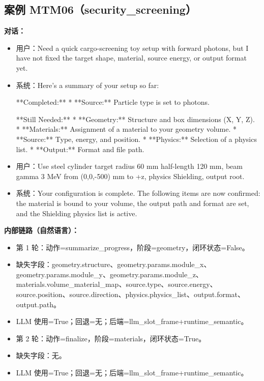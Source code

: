 \documentclass[11pt]{ctexart}
\begin{document}
\subsection{案例 MTM06（security\_screening）}
\textbf{对话：}
\begin{itemize}
\item 用户：Need a quick cargo-screening toy setup with forward photons, but I have not fixed the target shape, material, source energy, or output format yet.
\item 系统：Here's a summary of your setup so far:

**Completed:**
*   **Source:** Particle type is set to photons.

**Still Needed:**
*   **Geometry:** Structure and box dimensions (X, Y, Z).
*   **Materials:** Assignment of a material to your geometry volume.
*   **Source:** Type, energy, and position.
*   **Physics:** Selection of a physics list.
*   **Output:** Format and file path.
\item 用户：Use steel cylinder target radius 60 mm half-length 120 mm, beam gamma 3 MeV from (0,0,-500) mm to +z, physics Shielding, output root.
\item 系统：Your configuration is complete. The following items are now confirmed: the material is bound to your volume, the output path and format are set, and the Shielding physics list is active.
\end{itemize}
\textbf{内部链路（自然语言）：}
\begin{itemize}
\item 第 1 轮：动作=summarize\_progress，阶段=geometry，闭环状态=False。
\item 缺失字段：geometry.structure、geometry.params.module\_x、geometry.params.module\_y、geometry.params.module\_z、materials.volume\_material\_map、source.type、source.energy、source.position、source.direction、physics.physics\_list、output.format、output.path。
\item LLM 使用=True；回退=无；后端=llm\_slot\_frame+runtime\_semantic。
\item 第 2 轮：动作=finalize，阶段=materials，闭环状态=True。
\item 缺失字段：无。
\item LLM 使用=True；回退=无；后端=llm\_slot\_frame+runtime\_semantic。
\end{itemize}
\end{document}
